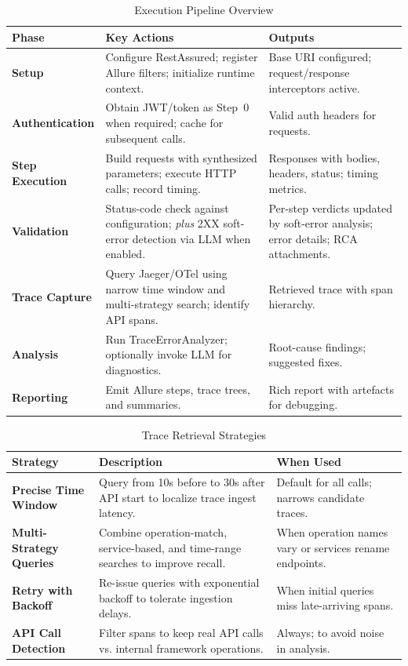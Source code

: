 \documentclass[conference]{IEEEtran}
\begin{document}
\begin{table}[t]
\centering
\caption{Execution Pipeline Overview}
\label{tab:exec-overview}
\renewcommand{\arraystretch}{1.15}\setlength{\tabcolsep}{6pt}
\begin{tabularx}{\textwidth}{>{\bfseries}p{} X p{}}
\toprule
Phase & Key Actions & Outputs \\
\midrule
Setup & Configure RestAssured; register Allure filters; initialize runtime context. & Base URI configured; request/response interceptors active. \\
Authentication & Obtain JWT/token as Step~0 when required; cache for subsequent calls. & Valid auth headers for requests. \\
Step Execution & Build requests with synthesized parameters; execute HTTP calls; record timing. & Responses with bodies, headers, status; timing metrics. \\
Validation & Status-code check against configuration; \emph{plus} 2XX soft-error detection via LLM when enabled. & Per-step verdicts updated by soft-error analysis; error details; RCA attachments. \\
Trace Capture & Query Jaeger/OTel using narrow time window and multi-strategy search; identify API spans. & Retrieved trace with span hierarchy. \\
Analysis & Run TraceErrorAnalyzer; optionally invoke LLM for diagnostics. & Root-cause findings; suggested fixes. \\
Reporting & Emit Allure steps, trace trees, and summaries. & Rich report with artefacts for debugging. \\
\bottomrule
\end{tabularx}
\end{table}

\begin{table}[t]
\centering
\caption{Trace Retrieval Strategies}
\label{tab:trace-retrieval}
\renewcommand{\arraystretch}{1.15}\setlength{\tabcolsep}{6pt}
\begin{tabularx}{\textwidth}{>{\bfseries}p{} X p{}}
\toprule
Strategy & Description & When Used \\
\midrule
Precise Time Window & Query from 10s before to 30s after API start to localize trace ingest latency. & Default for all calls; narrows candidate traces. \\
Multi-Strategy Queries & Combine operation-match, service-based, and time-range searches to improve recall. & When operation names vary or services rename endpoints. \\
Retry with Backoff & Re-issue queries with exponential backoff to tolerate ingestion delays. & When initial queries miss late-arriving spans. \\
API Call Detection & Filter spans to keep real API calls vs. internal framework operations. & Always; to avoid noise in analysis. \\
\bottomrule
\end{tabularx}
\end{table}
\end{document}
